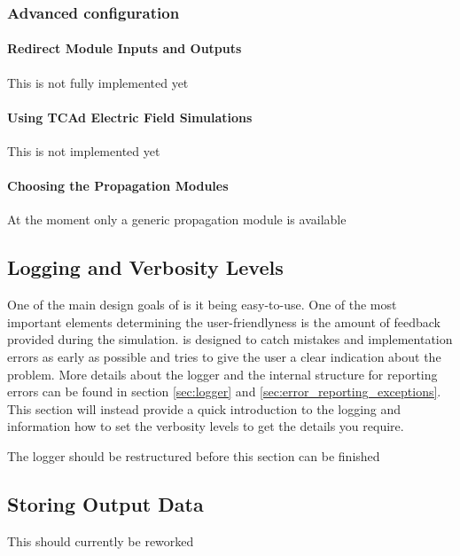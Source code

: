 \subsubsection{Advanced configuration}
\paragraph{Redirect Module Inputs and Outputs}
\todo This is not fully implemented yet \todo

\paragraph{Using TCAd Electric Field Simulations}
\todo This is not implemented yet \todo

\paragraph{Choosing the Propagation Modules}
\todo At the moment only a generic propagation module is available \todo

\subsection{Logging and Verbosity Levels}
\label{sec:logging_verbosity}
One of the main design goals of \apsq is it being easy-to-use. One of the most important elements determining the user-friendlyness is the amount of feedback provided during the simulation. \apsq is designed to catch mistakes and implementation errors as early as possible and tries to give the user a clear indication about the problem. More details about the logger and the internal structure for reporting errors can be found in section \ref{sec:logger} and \ref{sec:error_reporting_exceptions}. This section will instead provide a quick introduction to the logging and information how to set the verbosity levels to get the details you require.

\todo The logger should be restructured before this section can be finished \todo

\subsection{Storing Output Data}
\todo This should currently be reworked \todo
